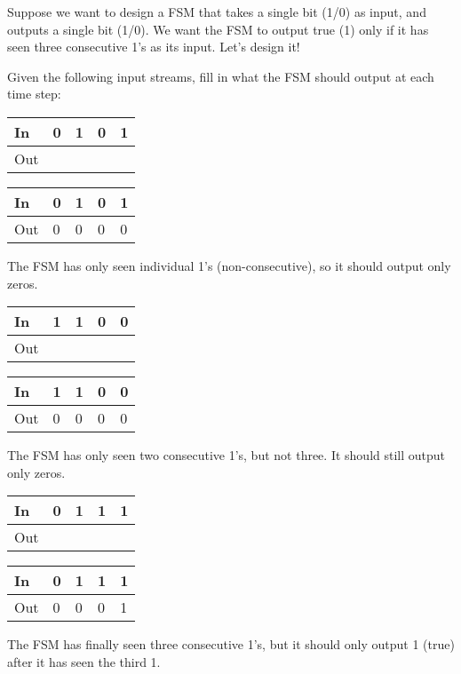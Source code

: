 \begin{blocksection}
Suppose we want to design a FSM that takes a single bit (1/0) as input, and outputs a single bit (1/0). We want the FSM to output true (1) only if it has seen three consecutive 1’s as its input. Let’s design it!

\question
Given the following input streams, fill in what the FSM should output at each time step:
\begin{parts}

\item
\begin{tabular}{ |l|l|l|l|l| } 
 \hline
 In & 0 & 1 & 0 & 1 \\
 \hline
 Out & & & & \\
 \hline
\end{tabular}

\begin{solution}
\begin{tabular}{ |l|l|l|l|l| } 
 \hline
 In & 0 & 1 & 0 & 1 \\
 \hline
 Out & 0 & 0 & 0 & 0 \\
 \hline
\end{tabular}
The FSM has only seen individual 1’s (non-consecutive), so it should output only zeros.
\end{solution}
\item

\begin{tabular}{ |l|l|l|l|l| } 
 \hline
 In & 1 & 1 & 0 & 0 \\
 \hline
 Out & & & & \\
 \hline
\end{tabular}

\begin{solution}
\begin{tabular}{ |l|l|l|l|l| } 
 \hline
 In & 1 & 1 & 0 & 0 \\
 \hline
 Out & 0 & 0 & 0 & 0 \\
 \hline
\end{tabular}
The FSM has only seen two consecutive 1’s, but not three. It should still output only zeros.
\end{solution}

\item
\begin{tabular}{ |l|l|l|l|l| } 
 \hline
 In & 0 & 1 & 1 & 1 \\
 \hline
 Out & & & & \\
 \hline
\end{tabular}

\begin{solution}
\begin{tabular}{ |l|l|l|l|l| } 
 \hline
 In & 0 & 1 & 1 & 1 \\
 \hline
 Out & 0 & 0 & 0 & 1 \\
 \hline
\end{tabular}
The FSM has finally seen three consecutive 1’s, but it should only output 1 (true) after it has seen the third 1.
\end{solution}
\end{parts}

\end{blocksection}